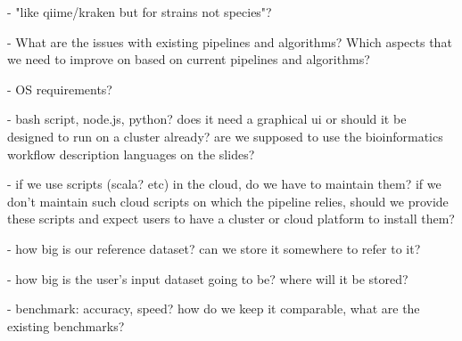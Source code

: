 \documentclass{article}
\begin{document}
- "like qiime/kraken but for strains not species"?

- What are the issues with existing pipelines and algorithms? Which aspects that we need to improve on based on current pipelines and algorithms?

- OS requirements? 

- bash script, node.js, python? does it need a graphical ui or should it be designed to run on a cluster already? are we supposed to use the bioinformatics workflow description languages on the slides?

- if we use scripts (scala? etc) in the cloud, do we have to maintain them? if we don't maintain such cloud scripts on which the pipeline relies, should we provide these scripts and expect users to have a cluster or cloud platform to install them?

- how big is our reference dataset? can we store it somewhere to refer to it?

- how big is the user's input dataset going to be? where will it be stored?

- benchmark: accuracy, speed? how do we keep it comparable, what are the existing benchmarks?
\end{document}
